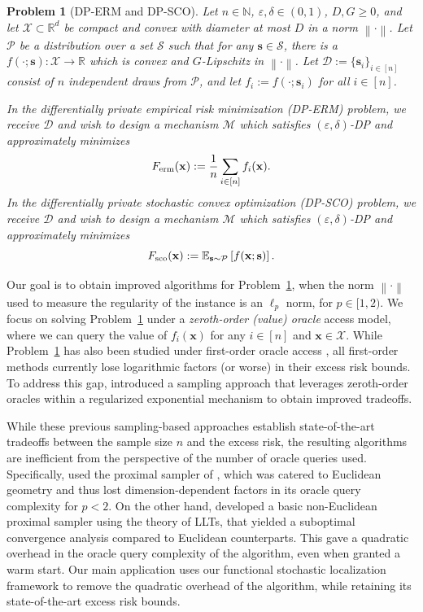 \documentclass[11pt]{article}
\newtheorem{problem}{Problem}
\newcommand{\defeq}{:=}
\newcommand{\norm}[1]{\left\lVert#1\right\rVert}
\newcommand{\eps}{\epsilon}
\newcommand{\xset}{\mathcal{X}}
\newcommand{\R}{\mathbb{R}}
\newcommand{\N}{\mathbb{N}}
\newcommand{\E}{\mathbb{E}}
\newcommand{\Brack}[1]{\left[#1\right]}
\newcommand{\0}{\mathbf{0}}
\newcommand{\1}{\mathbf{1}}
\newcommand{\vs}{\mathbf{s}}
\newcommand{\vx}{\mathbf{x}}
\newcommand{\calD}{\mathcal{D}}
\newcommand{\calM}{\mathcal{M}}
\newcommand{\calP}{\mathcal{P}}
\newcommand{\calS}{\mathcal{S}}
\newcommand{\calX}{\mathcal{X}}
\newcommand{\Ferm}{F_{\textup{erm}}}
\newcommand{\Fpop}{F_{\textup{sco}}}
\renewcommand{\epsilon}{\varepsilon}
\begin{document}
\begin{problem}[DP-ERM and DP-SCO]\label{prob:dpco}
Let $n \in \N$, $\eps, \delta \in (0, 1)$, $D, G \ge 0$, and let $\xset \subset \R^d$ be compact and convex with diameter at most $D$ in a norm $\norm{\cdot}$. Let $\calP$ be a distribution over a set $\calS$ such that for any $\vs \in \calS$, there is a $f(\cdot; \vs): \xset \to \R$ which is convex and $G$-Lipschitz in $\norm{\cdot}$. Let $\calD \defeq \{\vs_i\}_{i \in [n]}$ consist of $n$ independent draws from $\calP$, and let $f_i \defeq f(\cdot; \vs_i)$ for all $i \in [n]$. 

In the \emph{differentially private empirical risk minimization (DP-ERM)} problem, we receive $\calD$ and wish to design a mechanism $\calM$ which satisfies $(\eps, \delta)$-DP and approximately minimizes
\[\Ferm(\vx) \defeq \frac 1 n \sum_{i \in [n]} f_i(\vx).\]
In the \emph{differentially private stochastic convex optimization (DP-SCO)} problem, we receive $\calD$ and wish to design a mechanism $\calM$ which satisfies $(\eps, \delta)$-DP and approximately minimizes
\[\Fpop(\vx) \defeq \E_{\vs \sim \calP}\Brack{f(\vx; \vs)}.\]
\end{problem}

Our goal is to obtain improved algorithms for Problem~\ref{prob:dpco}, when the norm $\norm{\cdot}$ used to measure the regularity of the instance is an $\ell_p$ norm, for $p \in [1, 2)$. We focus on solving Problem~\ref{prob:dpco} under a \emph{zeroth-order (value) oracle} access model, where we can query the value of $f_i(\vx)$ for any $i \in [n]$ and $\vx \in \calX$. While Problem~\ref{prob:dpco} has also been studied under first-order oracle access \cite{AsiFKT21, BassilyGN21}, all first-order methods currently lose logarithmic factors (or worse) in their excess risk bounds. To address this gap, \cite{GopLL22, GopiLLST23a} introduced a sampling approach that leverages zeroth-order oracles within a regularized exponential mechanism to obtain improved tradeoffs.

While these previous sampling-based approaches \cite{GopiLLST23a, GopiLLST25} establish state-of-the-art tradeoffs between the sample size $n$ and the excess risk, the resulting algorithms are inefficient from the perspective of the number of oracle queries used. Specifically, \cite{GopiLLST23a} used the proximal sampler of \cite{LeeST21}, which was catered to Euclidean geometry and thus lost dimension-dependent factors in its oracle query complexity for $p < 2$. On the other hand, \cite{GopiLLST25} developed a basic non-Euclidean proximal sampler using the theory of LLTs, that yielded a suboptimal convergence analysis compared to Euclidean counterparts. This gave a quadratic overhead in the oracle query complexity of the \cite{GopiLLST25} algorithm, even when granted a warm start. Our main application uses our functional stochastic localization framework to remove the quadratic overhead of the \cite{GopiLLST25} algorithm, while retaining its state-of-the-art excess risk bounds.
\end{document}
